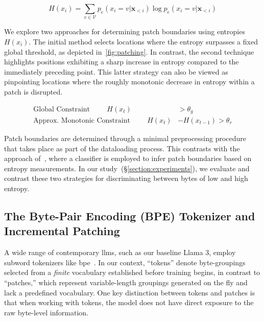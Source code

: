 \begin{equation}
H(x_i) = \sum_{v \in \mathcal{V}} p_{e}(x_i=v|\pmb{x}_{<i}) \log p_{e}(x_i=v|\pmb{x}_{<i})
\end{equation}

We explore two approaches for determining patch boundaries using entropies $H(x_i)$. The initial method selects locations where the entropy surpasses a fixed global threshold, as depicted in~\autoref{fig:patching}. In contrast, the second technique highlights positions exhibiting a sharp increase in entropy compared to the immediately preceding point. This latter strategy can also be viewed as pinpointing locations where the roughly monotonic decrease in entropy within a patch is disrupted.

\begin{align*}
    \text{Global Constraint}\hspace{1cm}H(x_t)& > \theta_g\\
    \text{Approx. Monotonic Constraint}\hspace{1cm}H(x_t)& - H(x_{t-1}) > \theta_r
\end{align*}

Patch boundaries are determined through a minimal preprocessing procedure that takes place as part of the dataloading process. This contrasts with the approach of~\citet{nawrot-etal-2023-efficient}, where a classifier is employed to infer patch boundaries based on entropy measurements. In our study~(\S\ref{section:experiments}), we evaluate and contrast these two strategies for discriminating between bytes of low and high entropy.

\subsection{The Byte-Pair Encoding (BPE) Tokenizer and Incremental Patching}
\label{section:incremental-patching}
\label{section:bpe-patch}

A wide range of contemporary llms, such as our baseline Llama 3, employ subword tokenizers like bpe~\citep{gage1994new, sennrich-etal-2016-neural}. In our context, ``tokens'' denote byte-groupings selected from a \textit{finite} vocabulary established before training begins, in contrast to ``patches,'' which represent variable-length groupings generated on the fly and lack a predefined vocabulary. One key distinction between tokens and patches is that when working with tokens, the model does not have direct exposure to the raw byte-level information.

